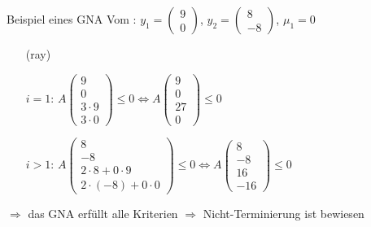\begin{frame}
	\begin{exampleblock}{Beispiel eines GNA }
		Vom \solver: $y_1=\begin{pmatrix} 9 \\ 0 \end{pmatrix}$, $y_2=\begin{pmatrix} 8 \\ -8 \end{pmatrix}$, $\mu_1=0$\newline
		\begin{itemize}
			\setlength{\itemindent}{0.5cm}
			\item[(ray)]
			\item[$i=1$:]  $A\begin{pmatrix} 9 \\ 0 \\ 3\cdot 9 \\ 3\cdot 0 \end{pmatrix} \le 0 \Leftrightarrow A\begin{pmatrix} 9 \\ 0 \\ 27 \\ 0 \end{pmatrix} \le 0$ \checkmark
			\item[$i>1$:] $A\begin{pmatrix} 8 \\ -8 \\ 2\cdot 8+0\cdot 9 \\ 2\cdot (-8)+0\cdot 0 \end{pmatrix} \le 0 \Leftrightarrow A\begin{pmatrix} 8 \\ -8 \\ 16 \\ -16 \end{pmatrix} \le 0$ \checkmark
		\end{itemize}
		$\Rightarrow$ das GNA erf\"ullt alle Kriterien\newline
		$\Rightarrow$ Nicht-Terminierung ist bewiesen
	\end{exampleblock}
\end{frame}







